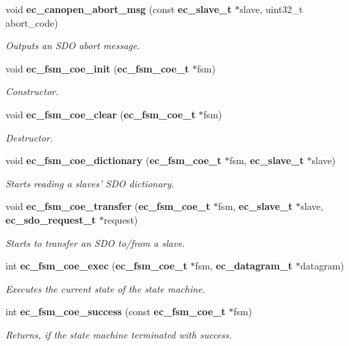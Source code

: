 \begin{DoxyCompactItemize}
void {\bf ec\-\_\-canopen\-\_\-abort\-\_\-msg} (const {\bf ec\-\_\-slave\-\_\-t} $\ast$slave, uint32\-\_\-t abort\-\_\-code)
\begin{DoxyCompactList}\small\item\em \-Outputs an \-S\-D\-O abort message. \end{DoxyCompactList}\item 
void {\bf ec\-\_\-fsm\-\_\-coe\-\_\-init} ({\bf ec\-\_\-fsm\-\_\-coe\-\_\-t} $\ast$fsm)
\begin{DoxyCompactList}\small\item\em \-Constructor. \end{DoxyCompactList}\item 
void {\bf ec\-\_\-fsm\-\_\-coe\-\_\-clear} ({\bf ec\-\_\-fsm\-\_\-coe\-\_\-t} $\ast$fsm)
\begin{DoxyCompactList}\small\item\em \-Destructor. \end{DoxyCompactList}\item 
void {\bf ec\-\_\-fsm\-\_\-coe\-\_\-dictionary} ({\bf ec\-\_\-fsm\-\_\-coe\-\_\-t} $\ast$fsm, {\bf ec\-\_\-slave\-\_\-t} $\ast$slave)
\begin{DoxyCompactList}\small\item\em \-Starts reading a slaves' \-S\-D\-O dictionary. \end{DoxyCompactList}\item 
void {\bf ec\-\_\-fsm\-\_\-coe\-\_\-transfer} ({\bf ec\-\_\-fsm\-\_\-coe\-\_\-t} $\ast$fsm, {\bf ec\-\_\-slave\-\_\-t} $\ast$slave, {\bf ec\-\_\-sdo\-\_\-request\-\_\-t} $\ast$request)
\begin{DoxyCompactList}\small\item\em \-Starts to transfer an \-S\-D\-O to/from a slave. \end{DoxyCompactList}\item 
int {\bf ec\-\_\-fsm\-\_\-coe\-\_\-exec} ({\bf ec\-\_\-fsm\-\_\-coe\-\_\-t} $\ast$fsm, {\bf ec\-\_\-datagram\-\_\-t} $\ast$datagram)
\begin{DoxyCompactList}\small\item\em \-Executes the current state of the state machine. \end{DoxyCompactList}\item 
int {\bf ec\-\_\-fsm\-\_\-coe\-\_\-success} (const {\bf ec\-\_\-fsm\-\_\-coe\-\_\-t} $\ast$fsm)
\begin{DoxyCompactList}\small\item\em \-Returns, if the state machine terminated with success. \end{DoxyCompactList}\item 

\end{DoxyCompactItemize}
